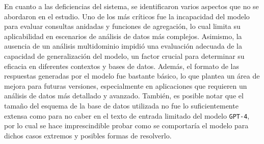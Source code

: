 En cuanto a las deficiencias del sistema, se identificaron varios aspectos que no se abordaron en el estudio. Uno de los más críticos fue la incapacidad del modelo para evaluar consultas anidadas y funciones de agregación, lo cual limita su aplicabilidad en escenarios de análisis de datos más complejos. Asimismo, la ausencia de un análisis multidominio impidió una evaluación adecuada de la capacidad de generalización del modelo, un factor crucial para determinar su eficacia en diferentes contextos y bases de datos. Además, el formato de las respuestas generadas por el modelo fue bastante básico, lo que plantea un área de mejora para futuras versiones, especialmente en aplicaciones que requieren un análisis de datos más detallado y avanzado. También, es posible notar que el tamaño del esquema de la base de datos utilizada no fue lo suficientemente extensa como para no caber en el texto de entrada limitado del modelo \texttt{GPT-4}, por lo cual se hace imprescindible probar como se comportaría el modelo para dichos casos extremos y posibles formas de resolverlo.

